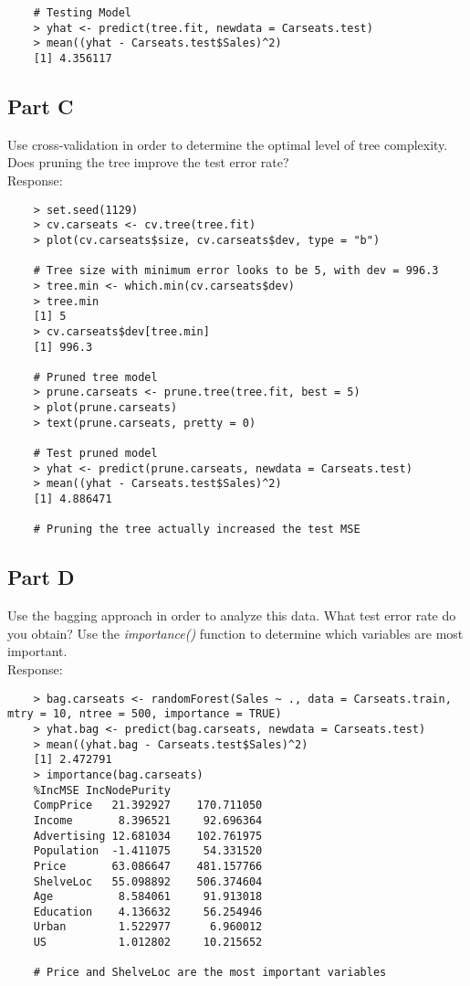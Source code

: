 \documentclass{article}
\begin{document}

\begin{verbatim}
	# Testing Model
	> yhat <- predict(tree.fit, newdata = Carseats.test)
	> mean((yhat - Carseats.test$Sales)^2)
	[1] 4.356117
\end{verbatim}

\break

	\subsection{Part C}
Use cross-validation in order to determine the optimal level of tree complexity. Does pruning the tree improve the test error rate? \\

Response:  
\begin{verbatim}
	> set.seed(1129)
	> cv.carseats <- cv.tree(tree.fit)
	> plot(cv.carseats$size, cv.carseats$dev, type = "b")
	
	# Tree size with minimum error looks to be 5, with dev = 996.3
	> tree.min <- which.min(cv.carseats$dev)
	> tree.min
	[1] 5
	> cv.carseats$dev[tree.min]
	[1] 996.3
	
	# Pruned tree model
	> prune.carseats <- prune.tree(tree.fit, best = 5)
	> plot(prune.carseats)
	> text(prune.carseats, pretty = 0)
	
	# Test pruned model 
	> yhat <- predict(prune.carseats, newdata = Carseats.test)
	> mean((yhat - Carseats.test$Sales)^2)
	[1] 4.886471
	
	# Pruning the tree actually increased the test MSE
\end{verbatim} 


\break

	\subsection{Part D}
Use the bagging approach in order to analyze this data. What test error rate do you obtain? Use the \textit{importance()} function to determine which variables are most important. \\

Response: 

\begin{verbatim}
	> bag.carseats <- randomForest(Sales ~ ., data = Carseats.train, mtry = 10, ntree = 500, importance = TRUE)
	> yhat.bag <- predict(bag.carseats, newdata = Carseats.test)
	> mean((yhat.bag - Carseats.test$Sales)^2)
	[1] 2.472791
	> importance(bag.carseats)
	%IncMSE IncNodePurity
	CompPrice   21.392927    170.711050
	Income       8.396521     92.696364
	Advertising 12.681034    102.761975
	Population  -1.411075     54.331520
	Price       63.086647    481.157766
	ShelveLoc   55.098892    506.374604
	Age          8.584061     91.913018
	Education    4.136632     56.254946
	Urban        1.522977      6.960012
	US           1.012802     10.215652

	# Price and ShelveLoc are the most important variables 
\end{verbatim}
\end{document}
